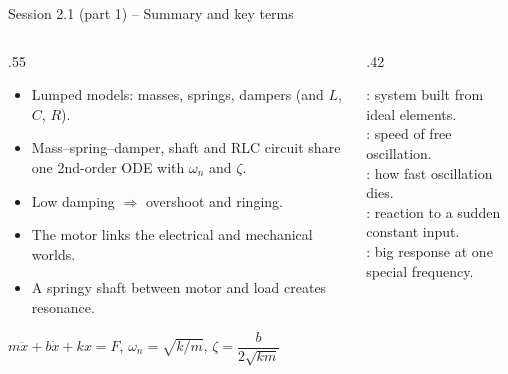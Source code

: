 \documentclass[aspectratio=169,10pt]{beamer}
\begin{document}
\begin{frame}{Session 2.1 (part 1) -- Summary and key terms}
\begin{columns}[T]
\begin{column}{.55\textwidth}
\small
\begin{itemize}
\item Lumped models: masses, springs, dampers (and $L$, $C$, $R$).
\item Mass--spring--damper, shaft and RLC circuit share one 2nd-order ODE with $\omega_n$ and $\zeta$.
\item Low damping $\Rightarrow$ overshoot and ringing.
\item The motor links the electrical and mechanical worlds.
\item A springy shaft between motor and load creates resonance.
\end{itemize}
\begin{keybox}[Remember]
$m\ddot x+b\dot x+kx=F$, \quad $\omega_n=\sqrt{k/m}$, \quad $\zeta=\dfrac{b}{2\sqrt{km}}$
\end{keybox}
\end{column}
\begin{column}{.42\textwidth}
\begin{defbox}
\small
{}: system built from ideal elements.\\
: speed of free oscillation.\\
: how fast oscillation dies.\\
: reaction to a sudden constant input.\\
: big response at one special frequency.
\end{defbox}
\end{column}
\end{columns}
\end{frame}

\end{document}
